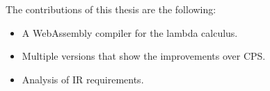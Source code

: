 The contributions of this thesis are the following:
\begin{itemize}
\item A WebAssembly compiler for the lambda calculus.
\item Multiple versions that show the improvements over \ac{CPS}.
\item Analysis of \ac{IR} requirements.
\end{itemize}